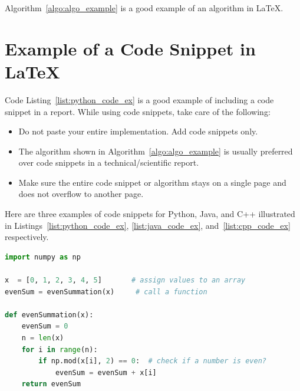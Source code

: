 Algorithm~\ref{algo:algo_example} is a good example of an algorithm in \LaTeX.

\begin{algorithm}
    \caption{Example caption: sum of all even numbers}
    \label{algo:algo_example}
    \begin{algorithmic}[1]
        \Statex
             
            \EndIf
        \EndFor
        \State {}
        \EndFunction
    \end{algorithmic}
\end{algorithm}

\section{Example of a Code Snippet in \LaTeX}
\label{sec:code_example}

Code Listing~\ref{list:python_code_ex} is a good example of including a code 
snippet in a report. While using code snippets, take care of the following:
\begin{itemize}
    \item Do not paste your entire implementation. Add code snippets only.
    \item The algorithm shown in Algorithm~\ref{algo:algo_example} is usually 
    preferred over code snippets in a technical/scientific report.
    \item Make sure the entire code snippet or algorithm stays on a single page 
    and does not overflow to another page.
\end{itemize}

Here are three examples of code snippets for Python, Java, and C++ illustrated 
in Listings~\ref{list:python_code_ex}, \ref{list:java_code_ex}, 
and~\ref{list:cpp_code_ex} respectively.

\begin{lstlisting}[language=Python, 
    caption={Code snippet in \LaTeX~--- Python example}, 
    label=list:python_code_ex]
import numpy as np

x  = [0, 1, 2, 3, 4, 5]       # assign values to an array
evenSum = evenSummation(x)     # call a function

def evenSummation(x):
    evenSum = 0
    n = len(x)
    for i in range(n):
        if np.mod(x[i], 2) == 0:  # check if a number is even?
            evenSum = evenSum + x[i]
    return evenSum
\end{lstlisting}

